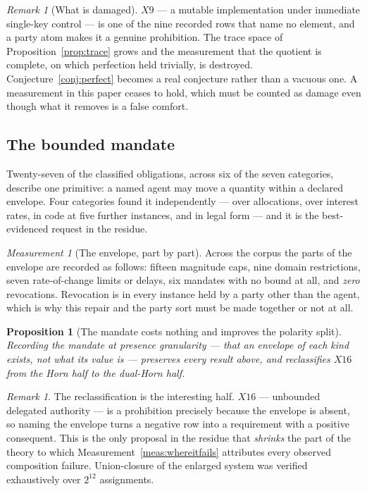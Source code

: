 \documentclass[11pt,reqno]{amsart}
\theoremstyle{plain}
\newtheorem{proposition}[theorem]{Proposition}
\theoremstyle{definition}
\theoremstyle{remark}
\newtheorem{measurement}[theorem]{Measurement}
\newtheorem{remark}[theorem]{Remark}
\begin{document}
\begin{remark}[What is damaged]
$X9$ --- a mutable implementation under immediate single-key control --- is one
of the nine recorded rows that name no element, and a party atom makes it a
genuine prohibition. The trace space of Proposition~\ref{prop:trace} grows and
the measurement that the quotient is complete, on which perfection held
trivially, is destroyed. Conjecture~\ref{conj:perfect} becomes a real conjecture
rather than a vacuous one. A measurement in this paper ceases to hold, which must
be counted as damage even though what it removes is a false comfort.
\end{remark}

\subsection{The bounded mandate}

Twenty-seven of the classified obligations, across six of the seven categories,
describe one primitive: a named agent may move a quantity within a declared
envelope. Four categories found it
independently --- over allocations, over interest rates, in code at five further
instances, and in legal form --- and it is the best-evidenced request in the
residue.

\begin{measurement}[The envelope, part by part]\label{meas:mandate}
Across the corpus the parts of the envelope are recorded as follows: fifteen
magnitude caps, nine domain restrictions, seven rate-of-change limits or delays,
six mandates with no bound at all, and \emph{zero} revocations. Revocation is in
every instance held by a party other than the agent, which is why this repair
and the party sort must be made together or not at all.
\end{measurement}

\begin{proposition}[The mandate costs nothing and improves the polarity split]\label{prop:mandate}
Recording the mandate at presence granularity --- that an envelope of each kind
exists, not what its value is --- preserves every result above, and reclassifies
$X16$ from the Horn half to the dual-Horn half.
\end{proposition}

\begin{remark}
The reclassification is the interesting half. $X16$ --- unbounded delegated
authority --- is a prohibition precisely because the envelope is absent, so
naming the envelope turns a negative row into a requirement with a positive
consequent. This is the only proposal in the residue that \emph{shrinks} the
part of the theory to which Measurement~\ref{meas:whereitfails} attributes every
observed composition failure. Union-closure of the enlarged system was verified
exhaustively over $2^{12}$ assignments.
\end{remark}
\end{document}
